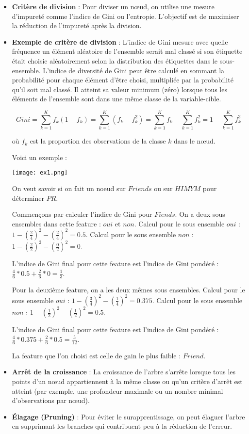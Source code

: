 \documentclass[10pt,a4paper]{article}
\begin{document}
\begin{itemize}
    \item \textbf{Critère de division} : Pour diviser un nœud, on utilise une mesure d'impureté comme l'indice de Gini ou l'entropie. L'objectif est de maximiser la réduction de l'impureté après la division.

    \item \textbf{Exemple de critère de division} : L'indice de Gini mesure avec quelle fréquence un élément aléatoire de l'ensemble serait mal classé si son étiquette était choisie aléatoirement selon la distribution des étiquettes dans le sous-ensemble. L'indice de diversité de Gini peut être calculé en sommant la probabilité pour chaque élément d'être choisi, multipliée par la probabilité qu'il soit mal classé. Il atteint sa valeur minimum (zéro) lorsque tous les éléments de l'ensemble sont dans une même classe de la variable-cible.

    \[
    Gini = \sum_{k=1}^{K} f_k (1-f_k) = \sum_{k=1}^{K} (f_k - f_k^2) = \sum_{k=1}^{K} f_k - \sum_{k=1}^{K} f_k^2 = 1 - \sum_{k=1}^{K} f_k^2
    \]

    où \( f_k \) est la proportion des observations de la classe \( k \) dans le nœud.
    
     Voici un exemple : 
     
     \texttt{[image: ex1.png]}
     
     On veut savoir si on fait un noeud sur $Friends$ ou sur $HIMYM$ pour déterminer $PR$.
     
     Commençons par calculer l'indice de Gini pour $Fiends$. On a deux sous ensembles dans cette feature : $oui$ et $non$.
     Calcul pour le sous ensemble $oui$ : $ 1 - (\frac{2}{4})^2 - (\frac{2}{4})^2 = 0.5$.
     Calcul pour le sous ensemble $non$ : $1 - (\frac{2}{2})^2 - (\frac{0}{2})^2 = 0$.

L'indice de Gini final pour cette feature est l'indice de Gini pondéré : $\frac{4}{6} * 0.5 + \frac{2}{6} * 0 = \frac{1}{3}$.

Pour la deuxième feature, on a les deux mêmes sous ensembles.
Calcul pour le sous ensemble $oui$ : $ 1 - (\frac{3}{4})^2 - (\frac{1}{4})^2 = 0.375$.
Calcul pour le sous ensemble $non$ : $1 - (\frac{1}{2})^2 - (\frac{1}{2})^2 = 0.5$.

L'indice de Gini final pour cette feature est l'indice de Gini pondéré : $\frac{4}{6} * 0.375 + \frac{2}{6} * 0.5 = \frac{5}{12}$.

La feature que l'on choisi est celle de gain le plus faible : $Friend$.

    \item \textbf{Arrêt de la croissance} : La croissance de l'arbre s'arrête lorsque tous les points d'un nœud appartiennent à la même classe ou qu'un critère d'arrêt est atteint (par exemple, une profondeur maximale ou un nombre minimal d'observations par nœud).

    \item \textbf{Élagage (Pruning)} : Pour éviter le surapprentissage, on peut élaguer l'arbre en supprimant les branches qui contribuent peu à la réduction de l'erreur.
\end{itemize}
\end{document}
